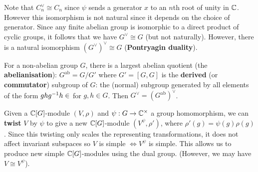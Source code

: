 \begin{rmk}
	Note that $C_n^\vee \cong C_n$ since $\psi$ sends a generator $x$ to an $n$th root of unity in $\mathbb{C}$.
	However this isomorphism is not natural since it depends on the choice of generator.
	Since any finite abelian group is isomorphic to a direct product of cyclic groups, it follows that we have $G^\vee \cong G$ (but not naturally).
	However, there is a natural isomorphism $(G^\vee)^\vee \cong G$ (\textbf{Pontryagin duality}).
	
	For a non-abelian group $G$, there is a largest abelian quotient (the \textbf{abelianisation}): $G^\text{ab} = G/G'$ where $G'=[G,G]$ is the \textbf{derived} (or \textbf{commutator}) subgroup of $G$: the (normal) subgroup generated by all elements of the form $ghg^{-1} h\in$ for $g,h \in G$.
	Then $G^\vee=(G^\text{ab})^\vee$.
	
	Given a $\mathbb{C}[G]$-module $(V,\rho)$ and $\psi: G \to \mathbb{C}^\times$ a group homomorphism, we can \textbf{twist} $V$ by $\psi$ to give a new $\mathbb{C}[G]$-module $(V^\psi,\rho')$, where $\rho'(g)=\psi(g)\rho(g)$.
	Since this twisting only scales the representing transformations, it does not affect invariant subspaces so $V$ is simple $\iff V^\psi$ is simple.
	This allows us to produce new simple $\mathbb{C}[G]$-modules using the dual group.
	(However, we may have $V \cong V^\psi$).
\end{rmk}

